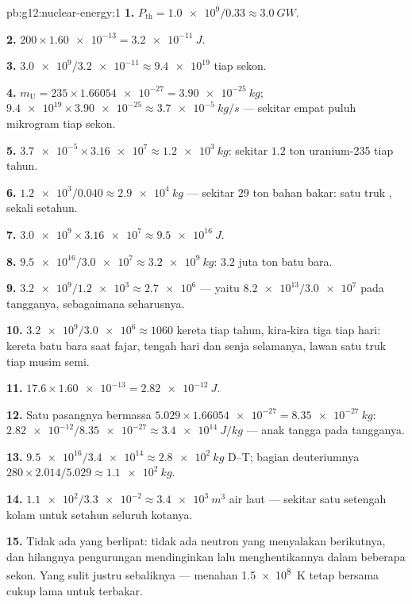 \begin{solution}{pb:g12:nuclear-energy:1}
\textbf{1.} $P_{\text{th}} = \num{1.0e9}/0.33 \approx \qty{3.0}{GW}$.

\textbf{2.} $200 \times \num{1.60e-13} = \qty{3.2e-11}{J}$.

\textbf{3.} $\num{3.0e9}/\num{3.2e-11} \approx \num{9.4e19}$ 
tiap sekon.

\textbf{4.} $m_{\mathrm U} = 235 \times \num{1.66054e-27} =
\qty{3.90e-25}{kg}$; $\num{9.4e19} \times \num{3.90e-25} \approx
\qty{3.7e-5}{kg/s}$ --- sekitar empat puluh mikrogram tiap sekon.

\textbf{5.} $\num{3.7e-5} \times \num{3.16e7} \approx \qty{1.2e3}{kg}$:
sekitar $1.2$ ton uranium-235 tiap tahun.

\textbf{6.} $\num{1.2e3}/0.040 \approx \qty{2.9e4}{kg}$ --- sekitar $29$
ton bahan bakar: satu truk , sekali setahun.

\textbf{7.} $\num{3.0e9} \times \num{3.16e7} \approx \qty{9.5e16}{J}$.

\textbf{8.} $\num{9.5e16}/\num{3.0e7} \approx \qty{3.2e9}{kg}$: $3.2$
juta ton batu bara.

\textbf{9.} $\num{3.2e9}/\num{1.2e3} \approx \num{2.7e6}$ --- yaitu
$\num{8.2e13}/\num{3.0e7}$ pada tangganya, sebagaimana seharusnya.

\textbf{10.} $\num{3.2e9}/\num{3.0e6} \approx 1060$ kereta tiap tahun,
kira-kira tiga tiap hari: kereta batu bara saat fajar, tengah hari dan senja selamanya,
lawan satu truk tiap musim semi.

\textbf{11.} $17.6 \times \num{1.60e-13} = \qty{2.82e-12}{J}$.

\textbf{12.} Satu pasangnya bermassa $5.029 \times \num{1.66054e-27} =
\qty{8.35e-27}{kg}$: $\num{2.82e-12}/\num{8.35e-27} \approx
\qty{3.4e14}{J/kg}$ --- anak tangga  pada tangganya.

\textbf{13.} $\num{9.5e16}/\num{3.4e14} \approx \qty{2.8e2}{kg}$
D--T; bagian deuteriumnya $280 \times 2.014/5.029 \approx \qty{1.1e2}{kg}$.

\textbf{14.} $\num{1.1e2}/\num{3.3e-2} \approx \qty{3.4e3}{m^3}$
air laut --- sekitar satu setengah kolam untuk setahun seluruh kotanya.

\textbf{15.} Tidak ada yang berlipat: tidak ada neutron yang menyalakan  berikutnya,
dan hilangnya pengurungan mendinginkan  lalu menghentikannya dalam beberapa sekon.
Yang sulit justru sebaliknya --- menahan \qty{1.5e8}{K} tetap bersama cukup
lama untuk terbakar.


\end{solution}
